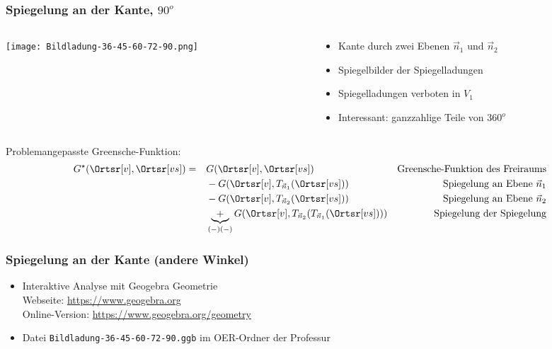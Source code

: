 \begin{frame}
  \frametitle{Spiegelung an der Kante, $90^o$}

  \begin{columns}
    \begin{column}{.5\textwidth}
      \texttt{[image: Bildladung-36-45-60-72-90.png]}
      \end{column}
      \begin{column}{.45\textwidth}
        \begin{itemize}[<+->]
        \item Kante durch zwei Ebenen $\vec{n}_1$ und $\vec{n}_2$
        \item Spiegelbilder der Spiegelladungen
        \item Spiegelladungen verboten in $V_1$
          \item Interessant: ganzzahlige Teile von $360^o$
          \end{itemize}
      \end{column}
    \end{columns}
    \pause
    Problemangepasste Greensche-Funktion:
    \begin{align*}
      G^\star(\Ortsr[v], \Ortsr[vs])  =\quad & G (\Ortsr[v], \Ortsr[vs]) & \text{Greensche-Funktion des Freiraums} \\
      & - G (\Ortsr[v], T_{\vec{n}_1}(\Ortsr[vs])) & \text{Spiegelung an Ebene } \vec{n}_1\\ 
                                               & - G (\Ortsr[v], T_{\vec{n}_2}(\Ortsr[vs])) & \text{Spiegelung an Ebene } \vec{n}_2\\
     & \underbrace{+}_{(-)( -)}  G (\Ortsr[v], T_{\vec{n}_2}(T_{\vec{n}_1}(\Ortsr[vs]))) & \text{Spiegelung der Spiegelung}
  \end{align*}
\end{frame}


\begin{frame}
  \frametitle{Spiegelung an der Kante (andere Winkel)}
  \begin{itemize}[<+->]
  \item Interaktive Analyse mit \alert{Geogebra Geometrie}\\
    Webseite: \url{https://www.geogebra.org}\\
    Online-Version: \url{https://www.geogebra.org/geometry}
    \item Datei \texttt{Bildladung-36-45-60-72-90.ggb} im OER-Ordner der Professur
  \end{itemize}
\end{frame}


